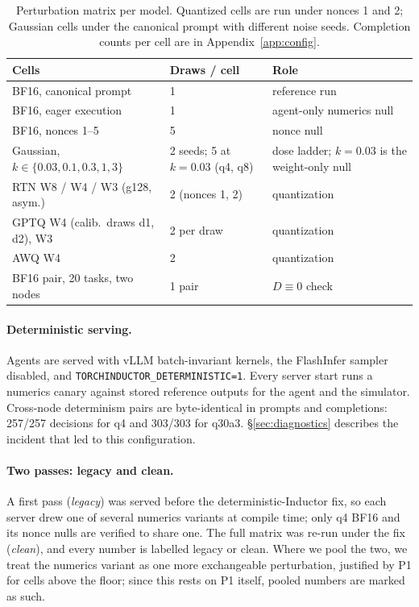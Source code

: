 \begin{table}[t]
\centering
\footnotesize
\setlength{\tabcolsep}{3pt}
\begin{tabular}{@{}p{3.2cm}p{1.75cm}p{2.25cm}@{}}
\toprule
Cells & Draws / cell & Role \\
\midrule
BF16, canonical prompt & 1 & reference run \\
BF16, eager execution & 1 & agent-only numerics null \\
BF16, nonces 1--5 & 5 & nonce null \\
Gaussian, $k \in \{0.03, 0.1, 0.3, 1, 3\}$ & 2 seeds; 5 at $k{=}0.03$ (q4, q8) & dose ladder; $k{=}0.03$ is the weight-only null \\
RTN W8 / W4 / W3 (g128, asym.) & 2 (nonces 1, 2) & quantization \\
GPTQ W4 (calib.\ draws d1, d2), W3 & 2 per draw & quantization \\
AWQ W4 & 2 & quantization \\
BF16 pair, 20 tasks, two nodes & 1 pair & $D \equiv 0$ check \\
\bottomrule
\end{tabular}
\caption{Perturbation matrix per model. Quantized cells are run under nonces 1 and 2; Gaussian cells under the canonical prompt with different noise seeds. Completion counts per cell are in Appendix~\ref{app:config}.}
\label{tab:matrix}
\end{table}

\paragraph{Deterministic serving.} Agents are served with vLLM batch-invariant kernels, the FlashInfer sampler disabled, and \texttt{TORCHINDUCTOR\_DETERMINISTIC=1}. Every server start runs a numerics canary against stored reference outputs for the agent and the simulator. Cross-node determinism pairs are byte-identical in prompts and completions: 257/257 decisions for q4 and 303/303 for q30a3. \S\ref{sec:diagnostics} describes the incident that led to this configuration.

\paragraph{Two passes: legacy and clean.} A first pass (\emph{legacy}) was served before the deterministic-Inductor fix, so each server drew one of several numerics variants at compile time; only q4 BF16 and its nonce nulls are verified to share one. The full matrix was re-run under the fix (\emph{clean}), and every number is labelled legacy or clean. Where we pool the two, we treat the numerics variant as one more exchangeable perturbation, justified by P1 for cells above the floor; since this rests on P1 itself, pooled numbers are marked as such.

